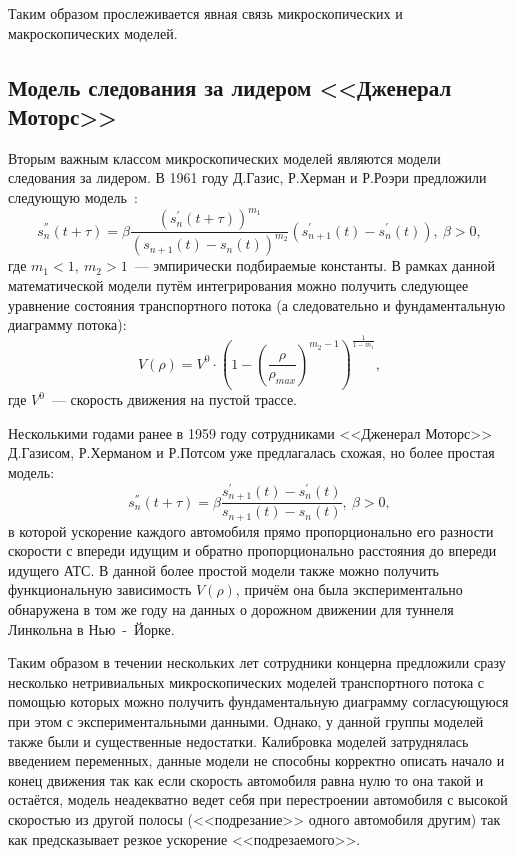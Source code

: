 Таким образом прослеживается явная связь микроскопических и макроскопических моделей.


\subsection{Модель следования за лидером <<Дженерал Моторс>>}\label{subsec:ch1/sec2/sub2}
Вторым важным классом микроскопических моделей являются модели следования за лидером.
В 1961 году Д.Газис, Р.Херман и Р.Роэри предложили следующую модель~\cite{gazis1974traffic}:
\[
    s_n^{''}(t+\tau) = \beta \frac{(s_n^{'}(t+\tau))^{m_1}}{(s_{n+1}(t) - s_n(t))^{m_2}}(s_{n+1}^{'}(t) - s_n^{'}(t)),\ \beta>0,
\]
где \(m_1<1,\ m_2>1\)~--- эмпирически подбираемые константы.
В рамках данной математической модели путём интегрирования можно получить следующее уравнение состояния транспортного потока (а следовательно и фундаментальную диаграмму потока):
\[
    V(\rho) = V^0\cdot\left(1 - \left(\frac{\rho}{\rho_{max}}\right)^{m_2 - 1} \right)^{\frac{1}{1-m_1}},
\]
где \(V^0\)~--- скорость движения на пустой трассе.

Несколькими годами ранее в 1959 году сотрудниками <<Дженерал Моторс>> Д.Газисом, Р.Херманом и Р.Потсом уже предлагалась схожая, но более простая модель:
\[
    s_n^{''}(t+\tau) = \beta \frac{s_{n+1}^{'}(t) - s_n^{'}(t)}{s_{n+1}(t) - s_n(t)},\ \beta>0,
\]
в которой ускорение каждого автомобиля прямо пропорционально его разности скорости с впереди идущим и обратно пропорционально расстояния до впереди идущего АТС.
В данной более простой модели также можно получить функциональную зависимость \(V(\rho)\), причём она была экспериментально обнаружена в том же году на данных о дорожном движении для туннеля Линкольна в Нью~-~Йорке.

Таким образом в течении нескольких лет сотрудники концерна предложили сразу несколько нетривиальных микроскопических моделей транспортного потока с помощью которых можно получить фундаментальную диаграмму согласующуюся при этом с экспериментальными данными.
Однако, у данной группы моделей также были и существенные недостатки.
Калибровка моделей затруднялась введением переменных, данные модели не способны корректно описать начало и конец движения так как если скорость автомобиля равна нулю то она такой и остаётся, модель неадекватно ведет себя при перестроении автомобиля с высокой скоростью из другой полосы (<<подрезание>> одного автомобиля другим) так как предсказывает резкое ускорение <<подрезаемого>>.


